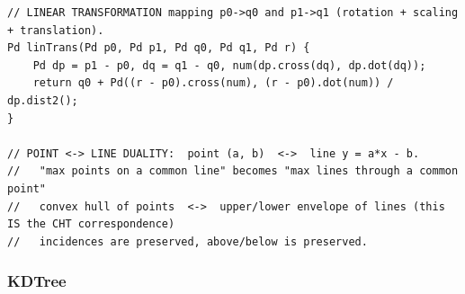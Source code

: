 \documentclass[9pt,a4paper,twocolumn]{extarticle}
\begin{document}
\begin{lstlisting}
// LINEAR TRANSFORMATION mapping p0->q0 and p1->q1 (rotation + scaling + translation).
Pd linTrans(Pd p0, Pd p1, Pd q0, Pd q1, Pd r) {
    Pd dp = p1 - p0, dq = q1 - q0, num(dp.cross(dq), dp.dot(dq));
    return q0 + Pd((r - p0).cross(num), (r - p0).dot(num)) / dp.dist2();
}

// POINT <-> LINE DUALITY:  point (a, b)  <->  line y = a*x - b.
//   "max points on a common line" becomes "max lines through a common point"
//   convex hull of points  <->  upper/lower envelope of lines (this IS the CHT correspondence)
//   incidences are preserved, above/below is preserved.
\end{lstlisting}

\filbreak
\subsubsection{KDTree}
\nopagebreak
\end{document}
